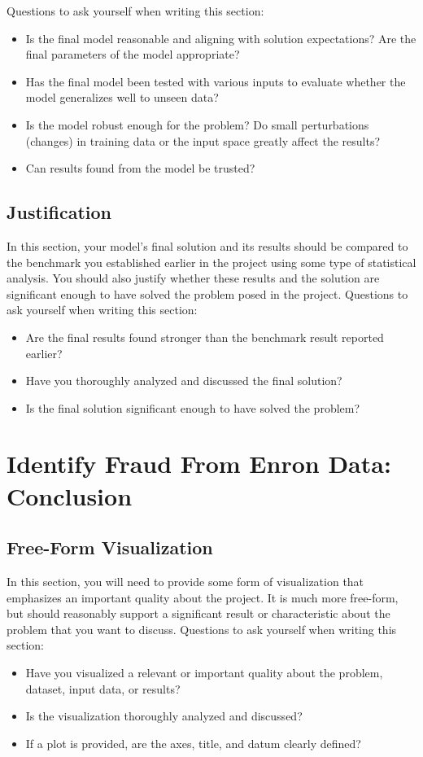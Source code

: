 \documentclass[twoside,openright,titlepage,numbers=noenddot,headinclude,%
               footinclude=true,cleardoublepage=empty,abstractoff,BCOR=5mm,%
               paper=a4,fontsize=11pt,ngerman,american]{scrreprt}
\numberwithin{theorem}{chapter}
\numberwithin{definition}{chapter}
\numberwithin{algorithm}{chapter}
\numberwithin{figure}{chapter}
\numberwithin{table}{chapter}
\numberwithin{equation}{chapter}
\begin{document}
Questions to ask yourself when writing this section:
\begin{itemize}%
\item Is the final model reasonable and aligning with solution expectations? Are the final parameters of the model appropriate?
\item Has the final model been tested with various inputs to evaluate whether the model generalizes well to unseen data?
\item Is the model robust enough for the problem? Do small perturbations (changes) in training data or the input space greatly affect the results?
\item Can results found from the model be trusted?
\end{itemize}

\section*{Justification}
In this section, your model’s final solution and its results should be compared to the benchmark you established earlier in the project using some type of statistical analysis. You should also justify whether these results and the solution are significant enough to have solved the problem posed in the project. Questions to ask yourself when writing this section:
\begin{itemize}%
\item Are the final results found stronger than the benchmark result reported earlier?
\item Have you thoroughly analyzed and discussed the final solution?
\item Is the final solution significant enough to have solved the problem?
\end{itemize}


\chapter*{Identify Fraud From Enron Data: Conclusion}

\section*{Free-Form Visualization}
In this section, you will need to provide some form of visualization that emphasizes an important quality about the project. It is much more free-form, but should reasonably support a significant result or characteristic about the problem that you want to discuss. Questions to ask yourself when writing this section:
\begin{itemize}%
\item Have you visualized a relevant or important quality about the problem, dataset, input data, or results?
\item Is the visualization thoroughly analyzed and discussed?
\item If a plot is provided, are the axes, title, and datum clearly defined?
\end{itemize}
\end{document}
